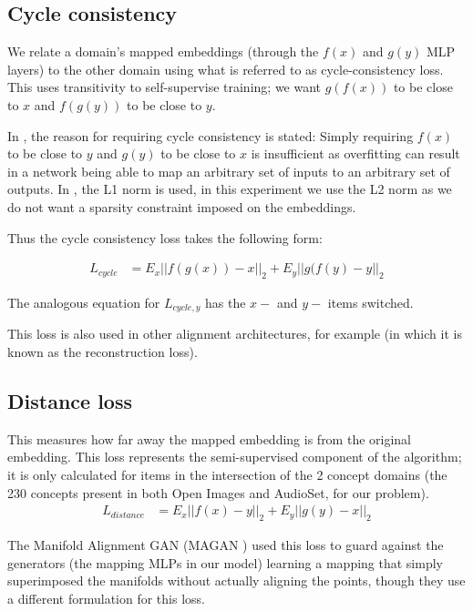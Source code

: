 \subsection{Cycle consistency}

We relate a domain's mapped embeddings (through the $f(x)$ and $g(y)$ MLP layers) to the other domain using what is referred to as cycle-consistency loss. This uses transitivity to self-supervise training; we want $g(f(x))$ to be close to $x$ and $f(g(y))$ to be close to $y$. 

In \cite{CycleGAN}, the reason for requiring cycle consistency is stated: Simply requiring $f(x)$ to be close to $y$ and $g(y)$ to be close to $x$ is insufficient as overfitting can result in a network being able to map an arbitrary set of inputs to an arbitrary set of outputs. In \cite{CycleGAN}, the L1 norm is used, in this experiment we use the L2 norm as we do not want a sparsity constraint imposed on the embeddings. 

Thus the cycle consistency loss takes the following form:

\begin{equation}
\begin{split}
L_{cycle} &= E_x ||f(g(x)) - x||_2 + E_y ||g(f(y) - y||_2
\end{split}
\end{equation}

The analogous equation for $L_{cycle, y}$ has the $x-$ and $y-$ items switched. 

This loss is also used in other alignment architectures, for example \cite{magan} (in which it is known as the reconstruction loss). 

\subsection{Distance loss}

This measures how far away the mapped embedding is from the original embedding. This loss represents the semi-supervised component of the algorithm; it is only calculated for items in the intersection of the 2 concept domains (the 230 concepts present in both Open Images and AudioSet, for our problem). 
\begin{equation}
\begin{split}
L_{distance} &= E_x||f(x) - y||_2 + E_y||g(y) - x||_2
\end{split}
\end{equation}

The Manifold Alignment GAN (MAGAN \cite{magan}) used this loss to guard against the generators (the mapping MLPs in our model) learning a mapping that simply superimposed the manifolds without actually aligning the points, though they use a different formulation for this loss. 

